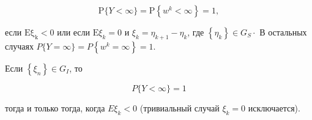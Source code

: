 \documentclass[10pt]{article}
\begin{document}
\[

\mathrm{P}\{Y<\infty\}=\mathrm{P}\left\{w^{k}<\infty\right\}=1,

\]



если $\mathrm{E \xi _{k }}<0$ или если $\mathrm{E} \xi_{k}=0$ и $\xi_{k}=\eta_{k+1}-\eta_{k}$, где $\left\{\eta_{k}\right\} \in G_{S} \cdot$ В остальных случаях $P\{Y=\infty\}=P\left\{w^{k}=\infty\right\}=1$.



Если $\left\{\xi_{n}\right\} \in G_{I}$, то



\[

P\{Y<\infty\}=1

\]



тогда и только тогда, когда $E \xi_{k}<0$ (тривиальный случай $\xi_{k}=0$ исключается).
\end{document}
